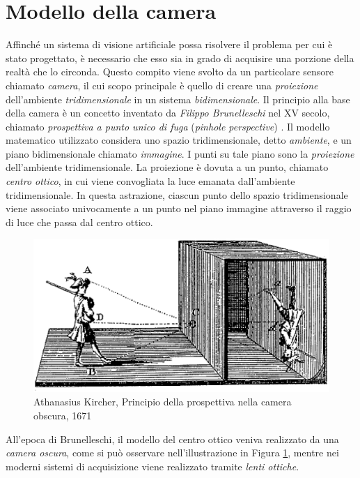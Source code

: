 \section{Modello della camera}
\label{modelloCamera}
Affinch\'e un sistema di visione artificiale possa risolvere il problema per cui \`e stato progettato, \`e necessario che esso sia in grado di acquisire una porzione della realt\`a che lo circonda.
Questo compito viene svolto da un particolare sensore chiamato \textit{camera}, il cui scopo principale \`e quello di creare una \textit{proiezione} dell'ambiente \textit{tridimensionale} in un sistema \textit{bidimensionale}.
Il principio alla base della camera \`e un concetto inventato da \textit{Filippo Brunelleschi} nel XV secolo, chiamato \textit{prospettiva a punto unico di fuga} (\textit{pinhole perspective}) \cite{manetti1976vita}.
Il modello matematico utilizzato considera uno spazio tridimensionale, detto \textit{ambiente}, e un piano bidimensionale chiamato \textit{immagine}. 
I punti su tale piano sono la \textit{proiezione} dell'ambiente tridimensionale.
La proiezione \`e dovuta a un punto, chiamato \textit{centro ottico}, in cui viene convogliata la luce emanata dall'ambiente tridimensionale.
In questa astrazione, ciascun punto dello spazio tridimensionale viene associato univocamente a un punto nel piano immagine attraverso il raggio di luce che passa dal centro ottico.
\begin{figure}[tb]
	\centering
	\includegraphics[width=12cm]{./pictures/cameraObscura}
	\caption{Athanasius Kircher, Principio della prospettiva nella camera obscura, 1671}
	\label{fig:prospettiva}
\end{figure} 
All'epoca di Brunelleschi, il modello del centro ottico veniva realizzato da una \textit{camera oscura}, come si pu\`o osservare nell'illustrazione in Figura \ref{fig:prospettiva}, mentre nei moderni sistemi di acquisizione viene realizzato tramite \textit{lenti ottiche}. 
